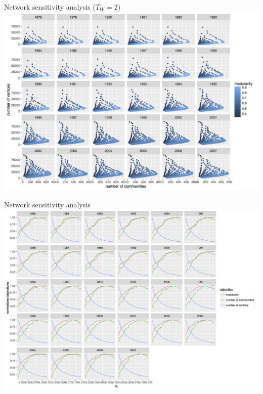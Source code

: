 \documentclass{beamer}
\begin{document}
\begin{frame}{Network sensitivity analysis ($T_W = 2$)}
	\includegraphics[width=\textwidth]{figures/vcount_comnum_pareto_window3.png}
\end{frame}


\begin{frame}{Network sensitivity analysis}
	\includegraphics[width=\textwidth]{figures/normalizedObjs-dispth_eth4_1e-5.png}
\end{frame}
\end{document}
